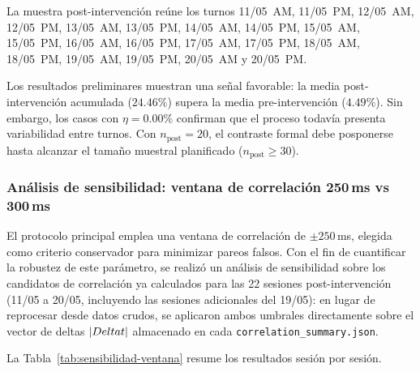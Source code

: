 La muestra post-intervención reúne los turnos 11/05~AM, 11/05~PM, 12/05~AM, 12/05~PM, 13/05~AM, 13/05~PM, 14/05~AM, 14/05~PM, 15/05~AM, 15/05~PM, 16/05~AM, 16/05~PM, 17/05~AM, 17/05~PM, 18/05~AM, 18/05~PM, 19/05~AM, 19/05~PM, 20/05~AM y 20/05~PM.

Los resultados preliminares muestran una señal favorable: la media post-intervención acumulada ($24.46\%$) supera la media pre-intervención ($4.49\%$). Sin embargo, los casos con $\eta=0.00\%$ confirman que el proceso todavía presenta variabilidad entre turnos. Con $n_{\text{post}}=20$, el contraste formal debe posponerse hasta alcanzar el tamaño muestral planificado ($n_{\text{post}} \geq 30$).

\subsubsection*{Análisis de sensibilidad: ventana de correlación 250\,ms vs 300\,ms}

El protocolo principal emplea una ventana de correlación de $\pm250$\,ms, elegida como criterio conservador para minimizar pareos falsos. Con el fin de cuantificar la robustez de este parámetro, se realizó un análisis de sensibilidad sobre los candidatos de correlación ya calculados para las 22 sesiones post-intervención (11/05 a 20/05, incluyendo las sesiones adicionales del 19/05): en lugar de reprocesar desde datos crudos, se aplicaron ambos umbrales directamente sobre el vector de deltas $|\\Delta t|$ almacenado en cada \texttt{correlation\_summary.json}.

La Tabla~\ref{tab:sensibilidad-ventana} resume los resultados sesión por sesión.

